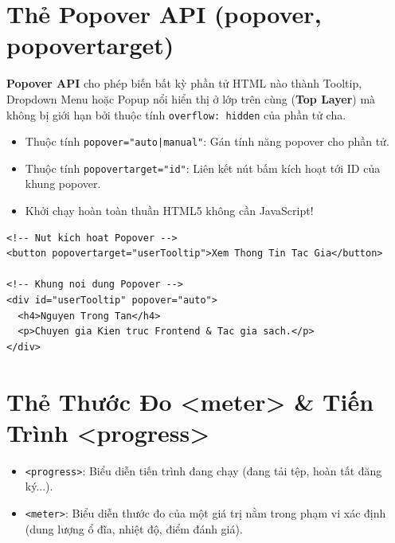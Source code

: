 \documentclass[11pt,oneside]{book}
\newcommand{\codeinline}[1]{\textcolor{accentOrange}{\texttt{#1}}}
\newcommand{\term}[1]{\textbf{\textcolor{primaryBlue}{#1}}}
\begin{document}
\section{Thẻ Popover API (popover, popovertarget)}
\label{sec:popover_api}

\begin{conceptBox}
\term{Popover API} cho phép biến bất kỳ phần tử HTML nào thành Tooltip, Dropdown Menu hoặc Popup nổi hiển thị ở lớp trên cùng (\term{Top Layer}) mà không bị giới hạn bởi thuộc tính \codeinline{overflow: hidden} của phần tử cha.
\begin{itemize}[leftmargin=1.5em, itemsep=2pt, parsep=0pt]
    \item Thuộc tính \codeinline{popover="auto|manual"}: Gán tính năng popover cho phần tử.
    \item Thuộc tính \codeinline{popovertarget="id"}: Liên kết nút bấm kích hoạt tới ID của khung popover.
    \item Khởi chạy hoàn toàn thuần HTML5 không cần JavaScript!
\end{itemize}
\end{conceptBox}

\begin{codeWindow}
\begin{lstlisting}[language=HTML5]
<!-- Nut kich hoat Popover -->
<button popovertarget="userTooltip">Xem Thong Tin Tac Gia</button>

<!-- Khung noi dung Popover -->
<div id="userTooltip" popover="auto">
  <h4>Nguyen Trong Tan</h4>
  <p>Chuyen gia Kien truc Frontend & Tac gia sach.</p>
</div>
\end{lstlisting}
\end{codeWindow}

\section{Thẻ Thước Đo <meter> \& Tiến Trình <progress>}
\label{sec:meter_progress}

\begin{conceptBox}
\begin{itemize}[leftmargin=1.5em, itemsep=2pt, parsep=0pt]
    \item \codeinline{<progress>}: Biểu diễn tiến trình đang chạy (đang tải tệp, hoàn tất đăng ký...).
    \item \codeinline{<meter>}: Biểu diễn thước đo của một giá trị nằm trong phạm vi xác định (dung lượng ổ đĩa, nhiệt độ, điểm đánh giá).
\end{itemize}
\end{conceptBox}
\end{document}
